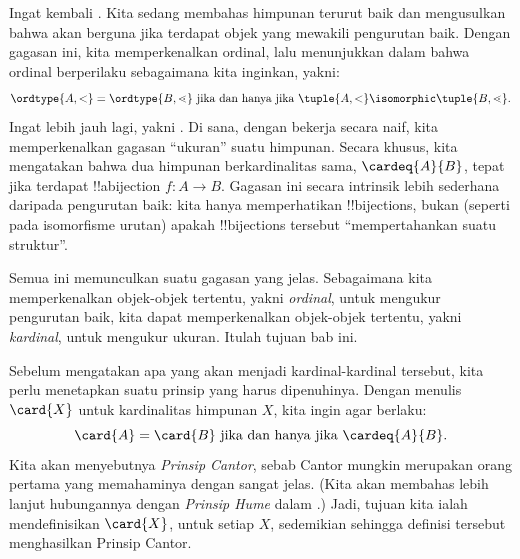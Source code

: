 \documentclass[../../../include/open-logic-section]{subfiles}
\begin{document}

Ingat kembali . Kita sedang membahas himpunan
terurut baik dan mengusulkan bahwa akan berguna jika terdapat objek yang
mewakili pengurutan baik. Dengan gagasan ini, kita memperkenalkan ordinal,
lalu menunjukkan dalam
 bahwa ordinal berperilaku
sebagaimana kita inginkan, yakni:
\[
	\ordtype{A, <} = \ordtype{B, \lessdot} 
	\text{ jika dan hanya jika } \tuple{A, <} \isomorphic \tuple{B, \lessdot}.
\]
Ingat lebih jauh lagi, yakni . Di sana, dengan
bekerja secara naif, kita memperkenalkan gagasan ``ukuran'' suatu himpunan.
Secara khusus, kita mengatakan bahwa dua himpunan berkardinalitas sama,
$\cardeq{A}{B}$, tepat jika terdapat !!a{bijection} $f \colon A \to B$.
Gagasan ini secara intrinsik {lebih sederhana} daripada pengurutan baik:
kita hanya memperhatikan !!{bijection}s, bukan (seperti pada isomorfisme
urutan) apakah !!{bijection}s tersebut ``mempertahankan suatu struktur''.

Semua ini memunculkan suatu gagasan yang jelas. Sebagaimana kita
memperkenalkan objek-objek tertentu, yakni \emph{ordinal}, untuk mengukur
pengurutan baik, kita dapat memperkenalkan objek-objek tertentu, yakni
\emph{kardinal}, untuk mengukur ukuran. Itulah tujuan bab ini.

Sebelum mengatakan apa yang akan menjadi kardinal-kardinal tersebut, kita
perlu menetapkan suatu prinsip yang harus dipenuhinya. Dengan menulis
$\card{X}$ untuk kardinalitas himpunan $X$, kita ingin agar berlaku:
\[
	\card{A} = \card{B} \text{ jika dan hanya jika } \cardeq{A}{B}.
\]
Kita akan menyebutnya \emph{Prinsip Cantor}, sebab Cantor mungkin merupakan
orang pertama yang memahaminya dengan sangat jelas. (Kita akan membahas lebih
lanjut hubungannya dengan \emph{Prinsip Hume} dalam .) Jadi,
tujuan kita ialah mendefinisikan $\card{X}$, untuk setiap $X$, sedemikian
sehingga definisi tersebut menghasilkan Prinsip Cantor.
\end{document}
